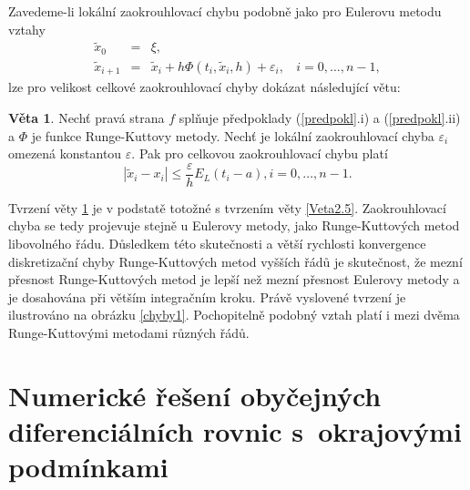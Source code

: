 \documentclass[a4paper, 12pt]{book}
\theoremstyle{definition}
\newtheorem{theorem}{Věta}[section]
\begin{document}
Zavedeme-li lokální zaokrouhlovací chybu podobně jako pro Eulerovu metodu vztahy
\begin{equation}\label{poskRK}
\begin{array}{crl}
\tilde x_0 & =& \xi,\\
\tilde x_{i+1} &=&\tilde x_i+h \Phi(t_i,\tilde x_i,h) + \varepsilon_i,~~~~ i=0,\dots,n-1,
\end{array}
\end{equation}
lze pro velikost celkové zaokrouhlovací chyby dokázat následující větu:
\begin{theorem}\label{Veta3.5}
Nechť pravá strana $f$ splňuje předpoklady (\ref{predpokl}.i) a (\ref{predpokl}.ii) 
a $\Phi$ je funkce Runge-Kuttovy metody. Nechť je lokální zaokrouhlovací chyba 
$\varepsilon_i$ omezená konstantou $\varepsilon$. Pak pro celkovou zaokrouhlovací 
chybu platí
\begin{equation}\label{zaokrchRK}
|\tilde x_i-x_i|\leq \frac\varepsilon h E_L(t_i-a), i=0,\dots,n-1.
\end{equation}
\end{theorem}

Tvrzení věty \ref{Veta3.5} je v podstatě totožné s tvrzením věty \ref{Veta2.5}.
Zaokrouhlovací chyba se tedy projevuje stejně u Eulerovy metody, jako Runge-Kuttových 
metod libovolného řádu. Důsledkem této skutečnosti a větší rychlosti konvergence 
diskretizační chyby Runge-Kuttových metod vyšších řádů je skutečnost, že mezní 
přesnost Runge-Kuttových metod je lepší než mezní přesnost Eulerovy metody a je
dosahována při větším integračním kroku. Právě vyslovené tvrzení je ilustrováno na
obrázku \ref{chyby1}. Pochopitelně podobný vztah platí i mezi dvěma Runge-Kuttovými 
metodami různých řádů.

\section[Numerické řešení ODR s okrajovými podmínkami]{Numerické řešení obyčejných 
diferenciálních rovnic s~okrajovými podmínkami}
\end{document}
